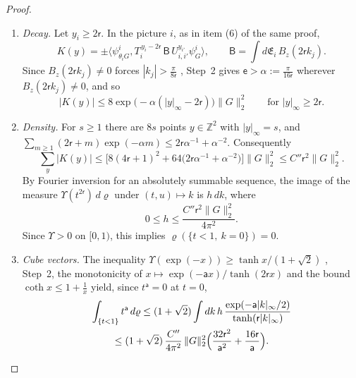 \documentclass[11pt]{amsart}
\theoremstyle{definition}
\begin{document}
\begin{proof}
\begin{enumerate}
\begin{equation*}
K(y)=\int d\varrho\,\Upsilon(t^{2\mathsf r})\,u^y,\qquad K(-y)=\overline{K(y)},\qquad|K|\le8\|G\|_2^2.
\end{equation*}
\item[4.] \emph{Decay.}
Let $y_i\ge2\mathsf r$.
In the picture $i$, as in item (6) of the same proof,
\begin{equation*}
K(y)=\pm\bigl\langle\psi^i_{\theta_iG},T_i^{\,y_i-2\mathsf r}\,\mathsf B\,U_{i,i'}^{y_{i'}}\psi^i_G\bigr\rangle,\qquad\mathsf B=\int d\mathfrak E_i\,B_z(2\mathsf rk_j).
\end{equation*}
Since $B_z(2\mathsf rk_j)\ne0$ forces $|k_j|>\frac{\pi}{8\mathsf r}$ \cite[Lemma~12.35]{QEDII}, Step~2 gives $\mathsf e>\alpha:=\frac{\pi}{16\mathsf r}$ wherever $B_z(2\mathsf rk_j)\ne0$, and so
\begin{equation*}
|K(y)|\le8\exp\bigl(-\alpha(|y|_\infty-2\mathsf r)\bigr)\|G\|_2^2\qquad\text{for }|y|_\infty\ge2\mathsf r.
\end{equation*}
\item[5.] \emph{Density.}
For $s\ge1$ there are $8s$ points $y\in\mathbb Z^2$ with $|y|_\infty=s$, and $\sum_{m\ge1}(2\mathsf r+m)\exp(-\alpha m)\le2\mathsf r\alpha^{-1}+\alpha^{-2}$.
Consequently
\begin{equation*}
\sum_y|K(y)|\le\bigl[8(4\mathsf r+1)^2+64\bigl(2\mathsf r\alpha^{-1}+\alpha^{-2}\bigr)\bigr]\|G\|_2^2\le C''\mathsf r^2\|G\|_2^2.
\end{equation*}
By Fourier inversion for an absolutely summable sequence, the image of the measure $\Upsilon(t^{2\mathsf r})\,d\varrho$ under $(t,u)\mapsto k$ is $h\,dk$, where
\begin{equation*}
0\le h\le\frac{C''\mathsf r^2\|G\|_2^2}{4\pi^2}.
\end{equation*}
Since $\Upsilon>0$ on $[0,1)$, this implies $\varrho(\{t<1,\ k=0\})=0$.
\item[6.] \emph{Cube vectors.}
The inequality $\Upsilon(\exp(-x))\ge\tanh x/(1+\sqrt2)$ \cite[Lemma~12.35]{QEDII}, Step~2, the monotonicity of $x\mapsto\exp(-\mathsf ax)/\tanh(2\mathsf rx)$ and the bound $\coth x\le1+\frac1x$ yield, since $t^{\mathsf a}=0$ at $t=0$,
\begin{multline*}
\int_{\{t<1\}}t^{\mathsf a}\,d\varrho\le(1+\sqrt2)\int dk\,h\,\frac{\exp(-\mathsf a|k|_\infty/2)}{\tanh(\mathsf r|k|_\infty)}\\
\le(1+\sqrt2)\,\frac{C''}{4\pi^2}\,\|G\|_2^2\Bigl(\frac{32\mathsf r^2}{\mathsf a^2}+\frac{16\mathsf r}{\mathsf a}\Bigr).
\end{multline*}

\end{enumerate}
\end{proof}
\end{document}

